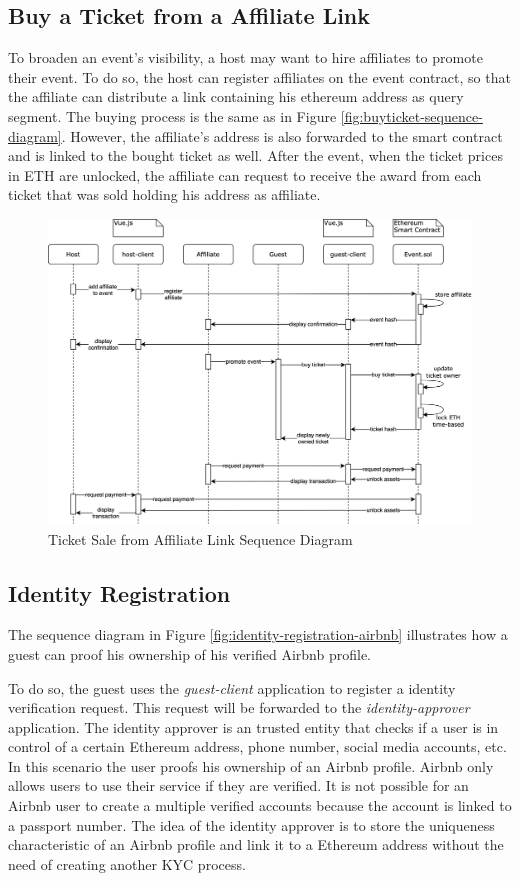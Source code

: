 \subsection{Buy a Ticket from a Affiliate Link}
To broaden an event's visibility, a host may want to hire affiliates to promote their event. To do so, the host can register affiliates on the event contract, so that the affiliate can distribute a link containing his ethereum address as query segment. The buying process is the same as in Figure \ref{fig:buyticket-sequence-diagram}. However, the affiliate's address is also forwarded to the smart contract and is linked to the bought ticket as well. After the event, when the ticket prices in ETH are unlocked, the affiliate can request to receive the award from each ticket that was sold holding his address as affiliate.
\begin{figure}[H]
    \centering
    \includegraphics[width=16cm]{design/diagrams/BuyTicketFromAffiliateLink.png}
    \caption{Ticket Sale from Affiliate Link Sequence Diagram}
    \label{fig:buyticket-from-affiliate-diagram}
\end{figure}

\subsection{Identity Registration}
The sequence diagram in Figure \ref{fig:identity-registration-airbnb} illustrates how a guest can proof his ownership of his verified Airbnb profile.

To do so, the guest uses the \textit{guest-client} application to register a identity verification request. This request will be forwarded to the \textit{identity-approver} application. The identity approver is an trusted entity that checks if a user is in control of a certain Ethereum address, phone number, social media accounts, etc. In this scenario the user proofs his ownership of an Airbnb profile. Airbnb only allows users to use their service if they are verified. It is not possible for an Airbnb user to create a multiple verified accounts because the account is linked to a passport number. The idea of the identity approver is to store the uniqueness characteristic of an Airbnb profile and link it to a Ethereum address without the need of creating another KYC process. 

